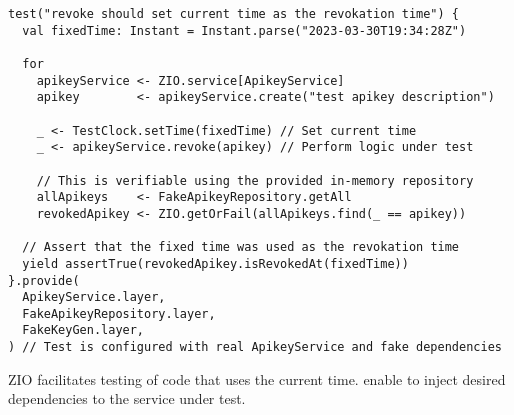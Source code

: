 \begin{algorithm}

\begin{verbatim}
test("revoke should set current time as the revokation time") {
  val fixedTime: Instant = Instant.parse("2023-03-30T19:34:28Z")

  for
    apikeyService <- ZIO.service[ApikeyService]
    apikey        <- apikeyService.create("test apikey description")

    _ <- TestClock.setTime(fixedTime) // Set current time
    _ <- apikeyService.revoke(apikey) // Perform logic under test

    // This is verifiable using the provided in-memory repository
    allApikeys    <- FakeApikeyRepository.getAll
    revokedApikey <- ZIO.getOrFail(allApikeys.find(_ == apikey))

  // Assert that the fixed time was used as the revokation time
  yield assertTrue(revokedApikey.isRevokedAt(fixedTime))
}.provide(
  ApikeyService.layer,
  FakeApikeyRepository.layer,
  FakeKeyGen.layer,
) // Test is configured with real ApikeyService and fake dependencies
\end{verbatim}

\caption{ZIO  facilitates testing of code that uses the current time.  enable to inject desired dependencies to the service under test. \label{casestudy:testclock}}
\end{algorithm}